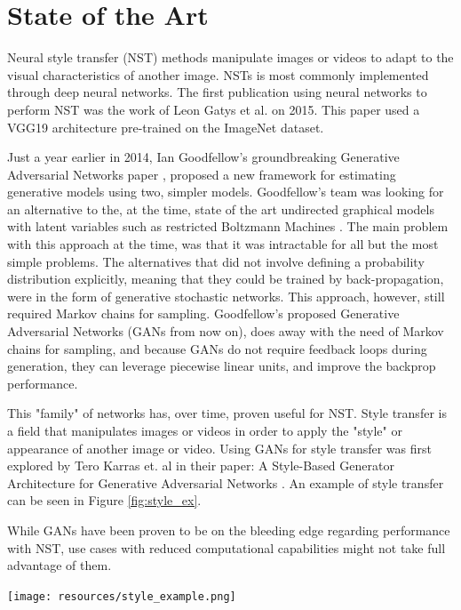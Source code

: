 
\section{State of the Art}

Neural style transfer (NST) methods manipulate images or videos to adapt to the visual characteristics of another image. NSTs is most commonly implemented through deep neural networks. The first publication using neural networks to perform NST was the work of Leon Gatys et al.\cite{DBLP:journals/corr/GatysEB15a} on 2015. This paper used a VGG19 architecture pre-trained on the ImageNet dataset. 


Just a year earlier in 2014, Ian Goodfellow's groundbreaking Generative Adversarial Networks paper \cite{goodfellow2014generative}, proposed a new framework for estimating generative models using two, simpler models. Goodfellow's team was looking for an alternative to the, at the time, state of the art undirected graphical models with latent variables such as restricted Boltzmann Machines \cite{computation_2021, rumelhart86a}. The main problem with this approach at the time, was that it was intractable for all but the most simple problems. The alternatives that did not involve defining a probability distribution explicitly, meaning that they could be trained by back-propagation, were in the form of generative stochastic networks\cite{DBLP:journals/corr/BengioT13}. This approach, however, still required Markov chains for sampling. Goodfellow's proposed Generative Adversarial Networks (GANs from now on), does away with the need of Markov chains for sampling, and because GANs do not require feedback loops during generation, they can leverage piecewise linear units, and improve the backprop performance.

This "family" of networks has, over time, proven useful for NST. Style transfer is a field that manipulates images or videos in order to apply the "style" or appearance of another image or video. Using GANs for style transfer was first explored by Tero Karras et. al in their paper: A Style-Based Generator Architecture for Generative Adversarial Networks \cite{stylegan}. An example of style transfer can be seen in Figure \ref{fig:style_ex}.

While GANs have been proven to be on the bleeding edge regarding performance with NST, use cases with reduced computational capabilities might not take full advantage of them.

\begin{Figure}[h]
 \centering
 \texttt{[image: resources/style\_example.png]}
 \label{fig:style_ex}
\end{Figure}

